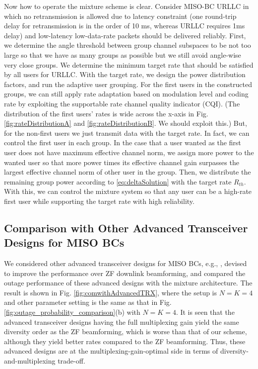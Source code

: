 \documentclass[11pt, draft, onecolumn ]{IEEEtran}
\begin{document}
Now how to operate the mixture scheme is clear. Consider MISO-BC URLLC in which no retransmission is allowed due to latency constraint (one round-trip delay for retransmission is in the order of 10 ms, whereas URLLC requires 1ms delay) and low-latency low-data-rate packets should be delivered reliably.
First, we determine the angle threshold between group channel subspaces to be not too large so that we have as many groups as possible but we still avoid angle-wise very close groups. We determine the minimum target rate that should be satisfied by all users for URLLC. With the target rate, we design the power distribution factors, and run the adaptive user grouping. For the first users in the constructed groups, we can still apply rate adaptation based on modulation level and coding rate by exploiting the supportable rate channel quality indicator (CQI). (The distribution of the first users' rates is wide across the x-axis in Fig. \ref{fig:rateDistributionA} and \ref{fig:rateDistributionB}. We should exploit this.) But, for the non-first users we just transmit data with the target rate. In fact, we can control the first user in each group. In the case that a user wanted as the first user does not have maximum effective channel norm, we assign more power to the wanted user so that more power times its effective channel gain surpasses the largest effective channel norm of other user in the group. Then, we distribute the remaining group power according to \eqref{eq:deltaSolution} with the target rate $R_{th}$. With this, we can control the mixture system so that any user can be a high-rate first user while supporting the target rate with high reliability.














\subsection{Comparison with Other Advanced Transceiver Designs for MISO BCs}






We considered other advanced transceiver designs for MISO BCs, e.g., \cite{HuRusek:17WC,PeelHochwaldSwindlehurst:05COM}, devised to improve the performance over ZF downlink beamforming, and compared the outage performance of these advanced designs with the mixture architecture. The result is shown in Fig. \ref{fig:comwithAdvancedTRX}, where the setup is $N=K=4$ and other parameter setting is the same as that in Fig.  \ref{fig:outage_probability_comparison}(b) with $N=K=4$. It is seen that the advanced transceiver designs having the full multiplexing gain yield  the same diversity order as the ZF beamforming, which is worse than that of our scheme,  although they yield better rates compared to the ZF beamforming. Thus, these advanced designs are at the multiplexing-gain-optimal side in terms of diversity-and-multiplexing trade-off.
\end{document}
